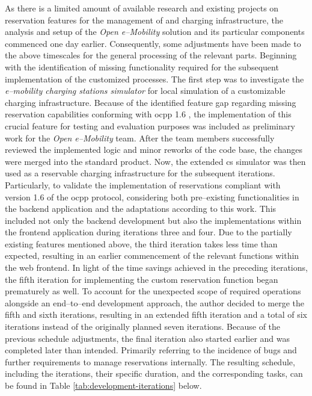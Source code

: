 As there is a limited amount of available research and existing projects on reservation features for the management of  and charging infrastructure, the analysis and setup of the \textit{Open e--Mobility} \cite{noauthor_github_nodate,noauthor_github_nodate-1,noauthor_github_nodate-2,noauthor_github_nodate-3} solution and its particular components commenced one day earlier.
Consequently, some adjustments have been made to the above timescales for the general processing of the relevant parts.
Beginning with the identification of missing functionality required for the subsequent implementation of the customized processes.
The first step was to investigate the \textit{e--mobility charging stations simulator} \cite{noauthor_github_nodate-3} for local simulation of a customizable charging infrastructure.
Because of the identified feature gap regarding missing reservation capabilities conforming with \acrshort{ocpp} 1.6 \cite{noauthor_ocpp_nodate}, the implementation of this crucial feature for testing and evaluation purposes was included as preliminary work for the \textit{Open e--Mobility} team.
After the team members successfully reviewed the implemented logic and minor reworks of the code base, the changes were merged into the standard product.
Now, the extended \acrshort{cs} simulator was then used as a reservable charging infrastructure for the subsequent iterations.
Particularly, to validate the implementation of reservations compliant with version 1.6 of the \acrshort{ocpp} protocol, considering both pre--existing functionalities in the backend application and the adaptations according to this work.
This included not only the backend development but also the implementations within the frontend application during iterations three and four.
Due to the partially existing features mentioned above, the third iteration takes less time than expected, resulting in an earlier commencement of the relevant functions within the web frontend.
In light of the time savings achieved in the preceding iterations, the fifth iteration for implementing the custom reservation function began prematurely as well.
To account for the unexpected scope of required operations alongside an end--to--end development approach, the author decided to merge the fifth and sixth iterations, resulting in an extended fifth iteration and a total of six iterations instead of the originally planned seven iterations.
Because of the previous schedule adjustments, the final iteration also started earlier and was completed later than intended.
Primarily referring to the incidence of bugs and further requirements to manage reservations internally.
The resulting schedule, including the iterations, their specific duration, and the corresponding tasks, can be found in Table \ref{tab:development-iterations} below.

